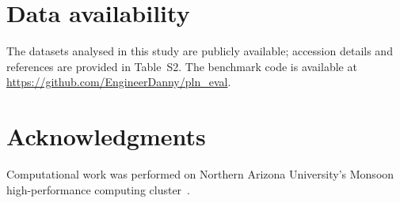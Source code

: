 \documentclass[preprint,review,12pt,authoryear]{elsarticle}
\begin{document}
\section*{Data availability}
The datasets analysed in this study are publicly available; accession details and references are provided in Table~S2.
The benchmark code is available at \url{https://github.com/EngineerDanny/pln_eval}.

\section*{Acknowledgments}
Computational work was performed on Northern Arizona University's Monsoon high-performance computing cluster~\citep{Buechler2025MonsoonIntro}.



\end{document}
